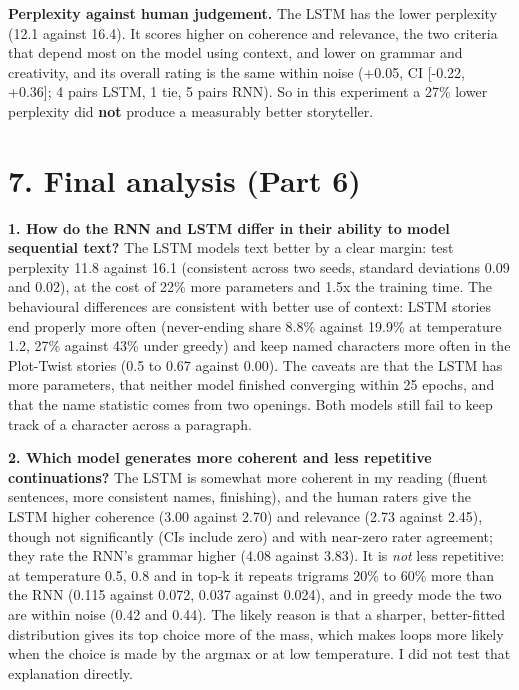 \documentclass[10pt,a4paper]{article}
\begin{document}
\textbf{Perplexity against human judgement.} The LSTM has the lower perplexity (12.1 against 16.4). It scores higher on coherence and relevance, the two criteria that depend most on the model
using context, and lower on grammar and creativity, and its overall rating is the same within noise (+0.05, CI {[}-0.22, +0.36{]}; 4 pairs LSTM, 1 tie, 5 pairs RNN). So in this experiment a 27\% lower perplexity did \textbf{not}
produce a measurably better storyteller.

\hypertarget{final-analysis-part-6}{%
\section{7. Final analysis (Part 6)}\label{final-analysis-part-6}}

\textbf{1. How do the RNN and LSTM differ in their ability to model sequential text?} The LSTM models text better by a clear
margin: test perplexity 11.8 against 16.1 (consistent across two seeds, standard deviations 0.09 and 0.02), at the cost of 22\% more parameters and 1.5x the training time.
The behavioural differences are consistent with better use of context: LSTM stories end properly more often (never-ending share 8.8\% against
19.9\% at temperature 1.2, 27\% against 43\% under greedy) and keep named characters more often in the Plot-Twist stories (0.5 to 0.67 against 0.00). The
caveats are that the LSTM has more parameters, that neither model finished converging within 25 epochs, and that the name statistic comes from
two openings. Both models still fail to keep track of a character across a paragraph.

\textbf{2. Which model generates more coherent and less repetitive continuations?} The LSTM is somewhat more coherent in my reading (fluent sentences,
more consistent names, finishing), and the human raters give the LSTM higher coherence (3.00 against 2.70) and relevance (2.73 against 2.45), though not significantly (CIs include zero) and with near-zero rater agreement; they rate the RNN's grammar higher (4.08 against 3.83). It is \emph{not} less repetitive: at temperature 0.5, 0.8 and in top-k it repeats trigrams 20\% to 60\%
more than the RNN (0.115 against 0.072, 0.037 against 0.024), and in greedy mode the two are within noise (0.42 and 0.44). The likely reason is that a
sharper, better-fitted distribution gives its top choice more of the mass, which makes loops more likely when the choice is made by the argmax or at low temperature. I did not test that explanation directly.
\end{document}
